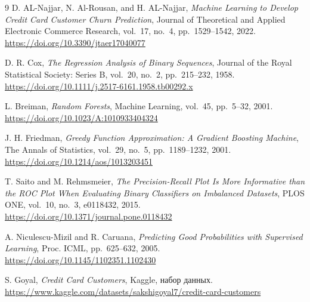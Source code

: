 \documentclass{misisarticle}
\begin{document}
\begin{thebibliography}{9}
D. AL-Najjar, N. Al-Rousan, and H. AL-Najjar, \textit{Machine Learning to Develop Credit Card Customer Churn Prediction}, Journal of Theoretical and Applied Electronic Commerce Research, vol.~17, no.~4, pp.~1529--1542, 2022. \url{https://doi.org/10.3390/jtaer17040077}

D. R. Cox, \textit{The Regression Analysis of Binary Sequences}, Journal of the Royal Statistical Society: Series B, vol.~20, no.~2, pp.~215--232, 1958. \url{https://doi.org/10.1111/j.2517-6161.1958.tb00292.x}

L. Breiman, \textit{Random Forests}, Machine Learning, vol.~45, pp.~5--32, 2001. \url{https://doi.org/10.1023/A:1010933404324}

J. H. Friedman, \textit{Greedy Function Approximation: A Gradient Boosting Machine}, The Annals of Statistics, vol.~29, no.~5, pp.~1189--1232, 2001. \url{https://doi.org/10.1214/aos/1013203451}

T. Saito and M. Rehmsmeier, \textit{The Precision-Recall Plot Is More Informative than the ROC Plot When Evaluating Binary Classifiers on Imbalanced Datasets}, PLOS ONE, vol.~10, no.~3, e0118432, 2015. \url{https://doi.org/10.1371/journal.pone.0118432}

A. Niculescu-Mizil and R. Caruana, \textit{Predicting Good Probabilities with Supervised Learning}, Proc. ICML, pp.~625--632, 2005. \url{https://doi.org/10.1145/1102351.1102430}

S. Goyal, \textit{Credit Card Customers}, Kaggle, набор данных. \url{https://www.kaggle.com/datasets/sakshigoyal7/credit-card-customers}
\end{thebibliography}
\end{document}

